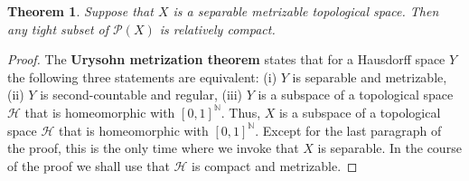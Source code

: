 \documentclass{article}
\newtheorem{theorem}{Theorem}
\theoremstyle{definition}
\begin{document}
\begin{theorem}
Suppose that $X$ is a separable metrizable topological space. Then any tight subset of  $\mathscr{P}(X)$ is  relatively compact.
\label{halfprokh}
\end{theorem}
\begin{proof}
The \textbf{Urysohn metrization theorem} states that for a Hausdorff space $Y$ the following three statements are equivalent:
(i) $Y$ is separable and metrizable, (ii) $Y$ is  second-countable and regular, (iii)  $Y$ is a subspace of a topological space $\mathscr{H}$ that is homeomorphic
with $[0,1]^\mathbb{N}$. Thus,  $X$ is a subspace of  a topological space $\mathscr{H}$ that
is homeomorphic with $[0,1]^\mathbb{N}$. Except for the last paragraph of the proof, this is the only time where we invoke that $X$ is separable. In the course of the proof we shall
 use that $\mathscr{H}$
is compact and metrizable.


\end{proof}
\end{document}
